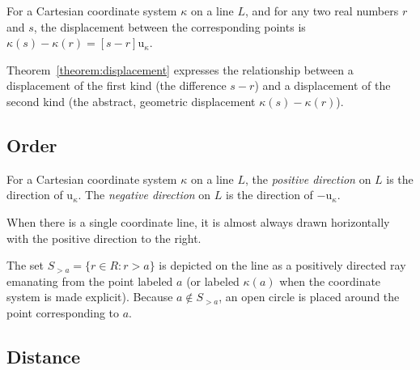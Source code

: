 \begin{theorem}
   For a Cartesian coordinate system $\kappa$ on a line $L$, and for any two
   real numbers $r$ and $s$, the displacement between the corresponding points
   is $\kappa(s) - \kappa(r) = [s - r] \mathrm{u}_\kappa$.
\label{theorem:displacement}
\end{theorem}

\noindent Theorem~\ref{theorem:displacement} expresses the relationship between
a displacement of the first kind (the difference $s - r$) and a displacement of
the second kind (the abstract, geometric displacement $\kappa(s) - \kappa(r)$).

\subsection{Order}

\begin{definition}
   For a Cartesian coordinate system $\kappa$ on a line $L$, the \emph{positive
   direction} on $L$ is the direction of $\mathrm{u}_\kappa$. The
   \emph{negative direction} on $L$ is the direction of $-\mathrm{u}_\kappa$.
\end{definition}

\noindent When there is a single coordinate line, it is almost always drawn
horizontally with the positive direction to the right.

The set $S_{>a} = \{r \in R : r > a\}$ is depicted on the line as a positively
directed ray emanating from the point labeled $a$ (or labeled $\kappa(a)$ when
the coordinate system is made explicit). Because $a \notin S_{>a}$, an open
circle is placed around the point corresponding to $a$.

\begin{center}
\end{center}

\subsection{Distance}


